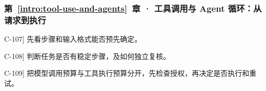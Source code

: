\subsubsection*{第~\ref*{intro:tool-use-and-agents}~章 · 工具调用与 Agent 循环：从请求到执行}
\begin{answerhints}
\item[\hyperref[exercise:fixed-workflow-audit]{C-107}] \leavevmode{}\label{hint:fixed-workflow-audit}先看步骤和输入格式能否预先确定。
\item[\hyperref[exercise:workflow-agent-choice]{C-108}] \leavevmode{}\label{hint:workflow-agent-choice}判断任务是否有稳定步骤，及如何独立复核。
\item[\hyperref[exercise:agent-bounded-retry-design]{C-109}] \leavevmode{}\label{hint:agent-bounded-retry-design}把模型调用预算与工具执行预算分开，先检查授权，再决定是否执行和重试。
\end{answerhints}
